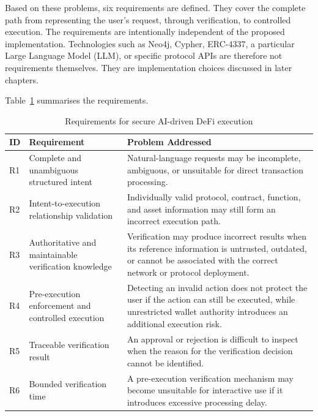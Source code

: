 Based on these problems, six requirements are defined. They cover the complete
path from representing the user's request, through verification, to controlled
execution. The requirements are intentionally independent of the proposed
implementation. Technologies such as Neo4j, Cypher, ERC-4337, a particular
Large Language Model (LLM), or specific protocol APIs are therefore not
requirements themselves. They are implementation choices discussed in later
chapters.

Table~\ref{tab:requirements_overview} summarises the requirements.

\begin{table}[H]
\centering
\small
\begin{tabular}{p{0.8cm} p{3.7cm} p{8.7cm}}
\hline
\textbf{ID} & \textbf{Requirement} & \textbf{Problem Addressed} \\ \hline

R1 &
Complete and unambiguous structured intent &
Natural-language requests may be incomplete, ambiguous, or unsuitable for
direct transaction processing. \\

R2 &
Intent-to-execution relationship validation &
Individually valid protocol, contract, function, and asset information may
still form an incorrect execution path. \\

R3 &
Authoritative and maintainable verification knowledge &
Verification may produce incorrect results when its reference information is
untrusted, outdated, or cannot be associated with the correct network or
protocol deployment. \\

R4 &
Pre-execution enforcement and controlled execution &
Detecting an invalid action does not protect the user if the action can still
be executed, while unrestricted wallet authority introduces an additional
execution risk. \\

R5 &
Traceable verification result &
An approval or rejection is difficult to inspect when the reason for the
verification decision cannot be identified. \\

R6 &
Bounded verification time &
A pre-execution verification mechanism may become unsuitable for interactive
use if it introduces excessive processing delay. \\

\hline
\end{tabular}
\caption{Requirements for secure AI-driven DeFi execution}
\label{tab:requirements_overview}
\end{table}



